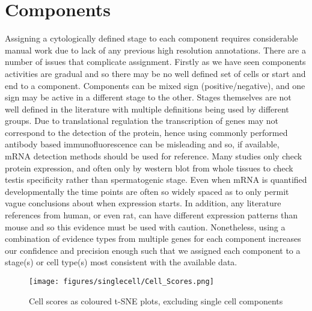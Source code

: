 \section{Components}
\label{sec:components}

Assigning a cytologically defined stage to each component requires considerable manual work due to lack of any previous high resolution annotations.
There are a number of issues that complicate assignment.
Firstly as we have seen components activities are gradual and so there may be no well defined set of cells or start and end to a component.
Components can be mixed sign (positive/negative), and one sign may be active in a different stage to the other.
Stages themselves are not well defined in the literature with multiple definitions being used by different groups.
Due to translational regulation the transcription of genes may not correspond to the detection of the protein, hence using commonly performed antibody based immunofluorescence can be misleading and so, if available, mRNA detection methods should be used for reference.
Many studies only check protein expression, and often only by western blot from whole tissues to check testis specificity rather than spermatogenic stage.
Even when mRNA is quantified developmentally the time points are often so widely spaced as to only permit vague conclusions about when expression starts.
In addition, any literature references from human, or even rat, can have different expression patterns than mouse and so this evidence must be used with caution.
Nonetheless, using a combination of evidence types from multiple genes for each component increases our confidence and precision enough such that we assigned each component to a stage(s) or cell type(s) most consistent with the available data.


\begin{figure}[H]
	\centering
	\texttt{[image: figures/singlecell/Cell\_Scores.png]}
	\caption[SDA Cell Scores]{Cell scores as coloured t-SNE plots, excluding single cell components}
	\label{fig:Cell_Scores}
\end{figure}




